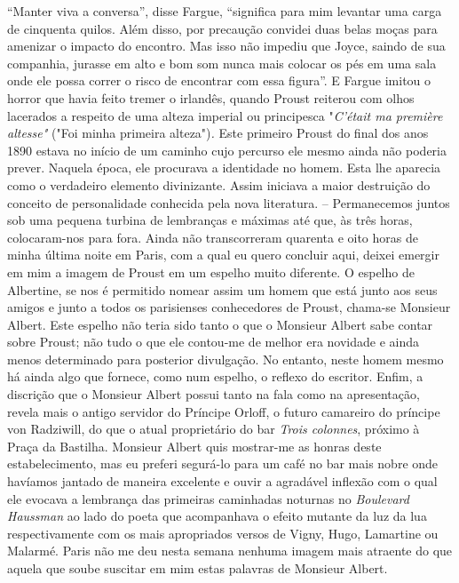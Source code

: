 ``Manter viva a conversa'', disse Fargue, ``significa para mim levantar
uma carga de cinquenta quilos. Além disso, por precaução convidei duas
belas moças para amenizar o impacto do encontro. Mas isso não impediu
que Joyce, saindo de sua companhia, jurasse em alto e bom som nunca mais
colocar os pés em uma sala onde ele possa correr o risco de encontrar
com essa figura''. E Fargue imitou o horror que havia feito tremer o
irlandês, quando Proust reiterou com olhos lacerados a respeito de uma
alteza imperial ou principesca "\emph{C'était ma première altesse"}
("Foi minha primeira alteza")\emph{.} Este primeiro Proust do final dos
anos 1890 estava no início de um caminho cujo percurso ele mesmo ainda
não poderia prever. Naquela época, ele procurava a identidade no homem.
Esta lhe aparecia como o verdadeiro elemento divinizante. Assim iniciava
a maior destruição do conceito de personalidade conhecida pela nova
literatura. -- Permanecemos juntos sob uma pequena turbina de lembranças
e máximas até que, às três horas, colocaram-nos para fora. Ainda não
transcorreram quarenta e oito horas de minha última noite em Paris, com
a qual eu quero concluir aqui, deixei emergir em mim a imagem de Proust
em um espelho muito diferente. O espelho de Albertine, se nos é
permitido nomear assim um homem que está junto aos seus amigos e junto a
todos os parisienses conhecedores de Proust, chama-se Monsieur Albert.
Este espelho não teria sido tanto o que o Monsieur Albert sabe contar
sobre Proust; não tudo o que ele contou-me de melhor era novidade e
ainda menos determinado para posterior divulgação. No entanto, neste
homem mesmo há ainda algo que fornece, como num espelho, o reflexo do
escritor. Enfim, a discrição que o Monsieur Albert possui tanto na fala
como na apresentação, revela mais o antigo servidor do Príncipe Orloff,
o futuro camareiro do príncipe von Radziwill, do que o atual
proprietário do bar \emph{Trois colonnes}, próximo à Praça da Bastilha.
Monsieur Albert quis mostrar-me as honras deste estabelecimento, mas eu
preferi segurá-lo para um café no bar mais nobre onde havíamos jantado
de maneira excelente e ouvir a agradável inflexão com o qual ele evocava
a lembrança das primeiras caminhadas noturnas no \emph{Boulevard
Haussman} ao lado do poeta que acompanhava o efeito mutante da luz da
lua respectivamente com os mais apropriados versos de Vigny, Hugo,
Lamartine ou Malarmé. Paris não me deu nesta semana nenhuma imagem mais
atraente do que aquela que soube suscitar em mim estas palavras de
Monsieur Albert.
